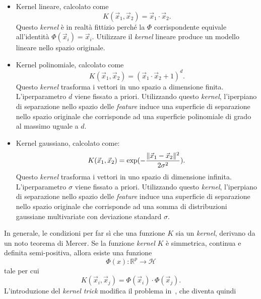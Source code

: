 \begin{itemize}
    \item Kernel lineare, calcolato come
    \begin{equation*}
        K(\Vec{x}_1, \Vec{x}_2) = \Vec{x}_1\cdot\Vec{x}_2.
    \end{equation*} 
    Questo \emph{kernel} è in realtà fittizio perché la $\Phi$ corrispondente equivale all'identità $\Phi(\Vec{x}_i)=\Vec{x}_i$. Utilizzare il \emph{kernel} lineare produce un modello lineare nello spazio originale.
    \item Kernel polinomiale, calcolato come
    \begin{equation*}
        K(\Vec{x}_1, \Vec{x}_2) = (\Vec{x}_1\cdot\Vec{x}_2 + 1)^d.
    \end{equation*} 
    Questo \emph{kernel} trasforma i vettori in uno spazio a dimensione finita. L'iperparametro $d$ viene fissato a priori. Utilizzando questo \emph{kernel}, l'iperpiano di separazione nello spazio delle \emph{feature} induce una superficie di separazione nello spazio originale che corrisponde ad una superficie polinomiale di grado al massimo uguale a $d$.
    \item Kernel gaussiano, calcolato come:
    \begin{equation*}
        K(\Vec{x}_1, \Vec{x}_2) = \mathrm{exp}({-\frac{\|\Vec{x}_1 - \Vec{x}_2\|^2}{2 \sigma^2}}).
    \end{equation*} 
    Questo \emph{kernel} trasforma i vettori in uno spazio di dimensione infinita. L'iperparametro $\sigma$ viene fissato a priori. Utilizzando questo \emph{kernel}, l'iperpiano di separazione nello spazio delle \emph{feature} induce una superficie di separazione nello spazio originale che corrisponde ad una somma di distribuzioni gaussiane multivariate con deviazione standard $\sigma$.
\end{itemize}
%
In generale, le condizioni per far sì che una funzione $K$ sia un \emph{kernel}, derivano da un noto teorema di Mercer\cite{mercer_theorem, RKHS}. Se la funzione \emph{kernel} $K$ è simmetrica, continua e definita semi-positiva, allora esiste una funzione 
\begin{equation}
    \Phi(x) : \mathbb{R}^p \rightarrow \mathcal{H}
\end{equation} 
tale per cui 
\begin{equation*}
    K(\Vec{x}_i, \Vec{x}_j) = \Phi(\Vec{x}_i)\cdot\Phi(\Vec{x}_j).
\end{equation*} 
L'introduzione del \emph{kernel trick} modifica il problema in~, che diventa quindi
